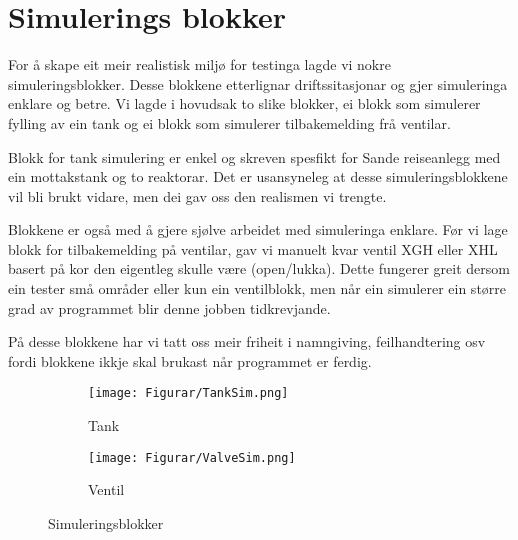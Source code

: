 \section{Simulerings blokker}
\thispagestyle{fancy}


For å skape eit meir realistisk miljø for testinga lagde vi nokre simuleringsblokker.
Desse blokkene etterlignar driftssitasjonar og gjer simuleringa enklare og betre.
Vi lagde i hovudsak to slike blokker, ei blokk som simulerer fylling av ein tank
og ei blokk som simulerer tilbakemelding frå ventilar.

Blokk for tank simulering er enkel og skreven spesfikt for Sande reiseanlegg med ein mottakstank
og to reaktorar.
Det er usansyneleg at desse simuleringsblokkene vil bli brukt vidare, men dei gav
oss den realismen vi trengte.

Blokkene er også med å gjere sjølve arbeidet med simuleringa enklare.
Før vi lage blokk for tilbakemelding på ventilar, 
gav vi manuelt kvar ventil XGH eller XHL basert på kor den eigentleg skulle være (open/lukka).
Dette fungerer greit dersom ein tester små områder eller kun ein ventilblokk, men
når ein simulerer ein større grad av programmet blir denne jobben tidkrevjande.

På desse blokkene har vi tatt oss meir friheit i namngiving, feilhandtering osv
fordi blokkene ikkje skal brukast når programmet er ferdig.

\begin{figure}[htbp]
    \centering
    \begin{subfigure}[b]{0.3\textwidth}
        \centering
        \texttt{[image: Figurar/TankSim.png]}
        \caption{Tank}\label{fig:TankSim}
    \end{subfigure}
    \hfill
    \begin{subfigure}[b]{0.3\textwidth}
        \centering
        \texttt{[image: Figurar/ValveSim.png]}
        \caption{Ventil}\label{fig:ValveSim}
    \end{subfigure}
    \caption{Simuleringsblokker}\label{fig:SimuleringsBlokker}
\end{figure}

\newpage
